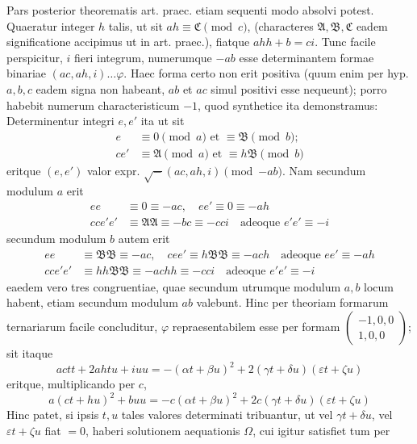 Pars posterior theorematis art. praec. etiam sequenti modo absolvi potest. Quaeratur integer \(h\) talis, ut sit \(ah\equiv\mathfrak C\pmod c\), (characteres \(\mathfrak A,\mathfrak B,\mathfrak C\) eadem significatione accipimus ut in art. praec.), fiatque \(ahh+b=ci\). Tunc facile perspicitur, \(i\) fieri integrum, numerumque \(-ab\) esse determinantem formae binariae \((ac,ah,i)\ldots\varphi\). Haec forma certo non erit positiva (quum enim per hyp. \(a,b,c\) eadem signa non habeant, \(ab\) et \(ac\) simul positivi esse nequeunt); porro habebit numerum characteristicum \(-1\), quod synthetice ita demonstramus: Determinentur integri \(e,e'\) ita ut sit
\[
\begin{aligned}
e&\equiv0\pmod a\text{ et }\equiv\mathfrak B\pmod b;\\
ce'&\equiv\mathfrak A\pmod a\text{ et }\equiv h\mathfrak B\pmod b
\end{aligned}
\]
eritque \((e,e')\) valor expr. \(\surd-(ac,ah,i)\pmod{-ab}\). Nam secundum modulum \(a\) erit
\[
\begin{aligned}
ee&\equiv0\equiv-ac,\quad ee'\equiv0\equiv-ah\\
cce'e'&\equiv\mathfrak A\mathfrak A\equiv-bc\equiv-cci\quad\text{adeoque }e'e'\equiv-i
\end{aligned}
\]
secundum modulum \(b\) autem erit
\[
\begin{aligned}
ee&\equiv\mathfrak B\mathfrak B\equiv-ac,\quad cee'\equiv h\mathfrak B\mathfrak B\equiv-ach\quad\text{adeoque }ee'\equiv-ah\\
cce'e'&\equiv hh\mathfrak B\mathfrak B\equiv-achh\equiv-cci\quad\text{adeoque }e'e'\equiv-i
\end{aligned}
\]
eaedem vero tres congruentiae, quae secundum utrumque modulum \(a,b\) locum habent, etiam secundum modulum \(ab\) valebunt. Hinc per theoriam formarum ternariarum facile concluditur, \(\varphi\) repraesentabilem esse per formam \(\left(\begin{smallmatrix}-1,0,0\\1,0,0\end{smallmatrix}\right)\); sit itaque
\[
actt+2ahtu+iuu=-(\alpha t+\beta u)^2+2(\gamma t+\delta u)(\varepsilon t+\zeta u)
\]
eritque, multiplicando per \(c\),
\[
a(ct+hu)^2+buu=-c(\alpha t+\beta u)^2+2c(\gamma t+\delta u)(\varepsilon t+\zeta u)
\]
Hinc patet, si ipsis \(t,u\) tales valores determinati tribuantur, ut vel \(\gamma t+\delta u\), vel \(\varepsilon t+\zeta u\) fiat \(=0\), haberi solutionem aequationis \(\Omega\), cui igitur satisfiet tum per
